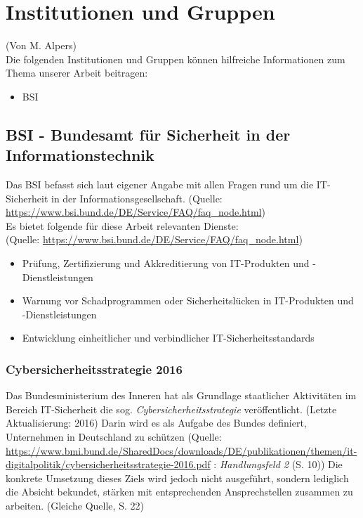 \chapter{Institutionen und Gruppen}
(Von M. Alpers)\\

Die folgenden Institutionen und Gruppen können hilfreiche Informationen zum Thema unserer Arbeit beitragen:

\begin{itemize}
	\item BSI
\end{itemize}

\section{BSI - Bundesamt für Sicherheit in der Informationstechnik}

Das BSI befasst sich laut eigener Angabe \glqq{}mit allen Fragen rund um die IT-Sicherheit in der Informationsgesellschaft.\grqq{} (Quelle: \url{https://www.bsi.bund.de/DE/Service/FAQ/faq_node.html})\\

Es bietet folgende für diese Arbeit relevanten Dienste:\\
(Quelle: \url{https://www.bsi.bund.de/DE/Service/FAQ/faq_node.html})

\begin{itemize}
	\item \glqq{}Prüfung, Zertifizierung und Akkreditierung von IT-Produkten und -Dienstleistungen\grqq{}
	\item \glqq{}Warnung vor Schadprogrammen oder Sicherheitslücken in IT-Produkten und -Dienstleistungen\grqq{}
	\item \glqq{}Entwicklung einheitlicher und verbindlicher IT-Sicherheitsstandards\grqq{}
\end{itemize}

\subsection{Cybersicherheitsstrategie 2016}

Das Bundesministerium des Inneren hat als Grundlage staatlicher Aktivitäten im Bereich IT-Sicherheit die sog. \emph{Cybersicherheitsstrategie} veröffentlicht. (Letzte Aktualisierung: 2016) Darin wird es als Aufgabe des Bundes definiert, \glqq{}Unternehmen in Deutschland zu schützen\grqq{} (Quelle: \url{https://www.bmi.bund.de/SharedDocs/downloads/DE/publikationen/themen/it-digitalpolitik/cybersicherheitsstrategie-2016.pdf} : \emph{Handlungsfeld 2} (S. 10)) Die konkrete Umsetzung dieses Ziels wird jedoch nicht ausgeführt, sondern lediglich die Absicht bekundet, stärken mit entsprechenden Ansprechstellen zusammen zu arbeiten. (Gleiche Quelle, S. 22)\\

